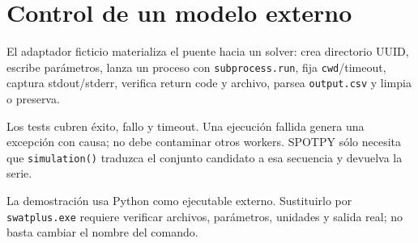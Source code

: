 \chapter{Control de un modelo externo}
El adaptador ficticio materializa el puente hacia un solver: crea directorio UUID, escribe parámetros, lanza un proceso con \texttt{subprocess.run}, fija \texttt{cwd}/timeout, captura stdout/stderr, verifica return code y archivo, parsea \texttt{output.csv} y limpia o preserva.

Los tests cubren éxito, fallo y timeout. Una ejecución fallida genera una excepción con causa; no debe contaminar otros workers. SPOTPY sólo necesita que \texttt{simulation()} traduzca el conjunto candidato a esa secuencia y devuelva la serie.

La demostración usa Python como ejecutable externo. Sustituirlo por \texttt{swatplus.exe} requiere verificar archivos, parámetros, unidades y salida real; no basta cambiar el nombre del comando.

